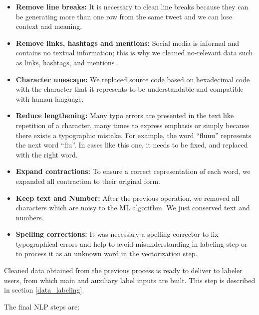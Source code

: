 \documentclass[12pt]{report}
\begin{document}
\begin{itemize}[nolistsep]
	\item \textbf{Remove line breaks:} It is necessary to clean line breaks because they can be generating more than one row from the same tweet and we can lose context and meaning.
	
	\item \textbf{Remove links, hashtags and mentions:} Social media is informal and contains no textual information; this is why we cleaned no-relevant data such as links, hashtags, and mentions \cite{Dai2017}.
	
	\item \textbf{Character unescape:} We replaced source code based on hexadecimal code with the character that it represents to be understandable and compatible with human language.
	
	\item \textbf{Reduce lengthening:} Many typo errors are presented in the text like repetition of a character, many times to express emphasis or simply because there exists a typographic mistake. For example, the word ``fluuu'' represents the next word ``flu''. In cases like this one,  it needs to be fixed, and replaced with the right word.
	
	\item \textbf{Expand contractions:} To ensure a correct representation of each word, we expanded all contraction to their original form.
	
	\item \textbf{Keep text and Number:} After the previous operation, we removed all characters which are noisy to the \ac{ML} algorithm. We just conserved text and numbers.
	
	\item \textbf{Spelling corrections:} It was necessary a spelling corrector to fix typographical errors and help to avoid misunderstanding in labeling step or to process it as an unknown word in the vectorization step.\\
	
\end{itemize}

Cleaned data obtained from the previous process is ready to deliver to labeler users, from which main and auxiliary label inputs are built. This step is described in section \ref{data_labeling}.

The final \ac{NLP} steps are: 
\end{document}
